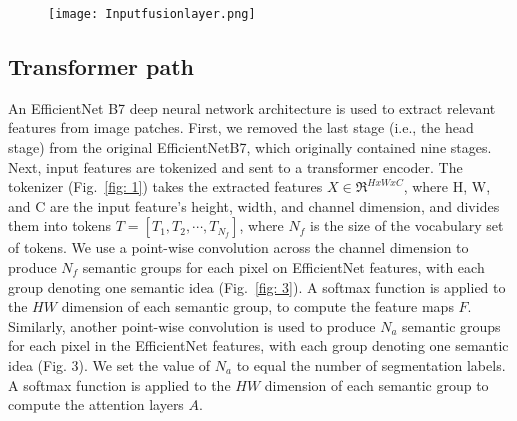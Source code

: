 \documentclass[journal]{IEEEtran}
\begin{document}
\begin{figure}  
\centering
\texttt{[image: Inputfusionlayer.png]}
\label{fig: 2}
\end{figure}



\subsection{Transformer path}
An EfficientNet B7 \cite{pmlr-v97-tan19a} deep neural network architecture is used to extract relevant features from image patches. First, we removed the last stage (i.e., the head stage) from the original EfficientNetB7, which originally contained nine stages. 
Next, input features are tokenized and sent to a transformer encoder. The tokenizer (Fig.~\ref{fig: 1}) takes the extracted features $X \in \Re ^{HxWxC}$, where H, W, and C are the input feature’s height, width, and channel dimension, and divides them into tokens $T =[T_1, T_2, \cdots, T_{N_f}]$, where $N_f$ is the size of the vocabulary set of tokens.
We use a point-wise convolution across the channel dimension to produce $N_f$ semantic groups for each pixel on EfficientNet features, with each group denoting one semantic idea (Fig.~\ref{fig: 3}). A softmax function is applied to the $HW$ dimension of each semantic group, to compute the feature maps $F$. Similarly, another point-wise convolution is used to produce $N_a$ semantic groups for each pixel in the EfficientNet features, with each group denoting one semantic idea (Fig. 3). We set the value of $N_a$ to equal the number of segmentation labels. A softmax function is applied to the $HW$ dimension of each semantic group to compute the attention layers $A$.
\end{document}
